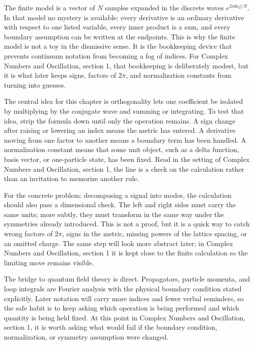 The finite model is a vector of \(N\) samples expanded in the discrete waves \(e^{2\pi \ii nj/N}\).  In that model no mystery is available: every derivative is an ordinary derivative with respect to one listed variable, every inner product is a sum, and every boundary assumption can be written at the endpoints.  This is why the finite model is not a toy in the dismissive sense.  It is the bookkeeping device that prevents continuum notation from becoming a fog of indices.  For Complex Numbers and Oscillation, section 1, that bookkeeping is deliberately modest, but it is what later keeps signs, factors of \(2\pi\), and normalization constants from turning into guesses.

The central idea for this chapter is orthogonality lets one coefficient be isolated by multiplying by the conjugate wave and summing or integrating.  To test that idea, strip the formula down until only the operation remains.  A sign change after raising or lowering an index means the metric has entered.  A derivative moving from one factor to another means a boundary term has been handled.  A normalization constant means that some unit object, such as a delta function, basis vector, or one-particle state, has been fixed.  Read in the setting of Complex Numbers and Oscillation, section 1, the line is a check on the calculation rather than an invitation to memorize another rule.

For the concrete problem: decomposing a signal into modes, the calculation should also pass a dimensional check.  The left and right sides must carry the same units; more subtly, they must transform in the same way under the symmetries already introduced.  This is not a proof, but it is a quick way to catch wrong factors of \(2\pi\), signs in the metric, missing powers of the lattice spacing, or an omitted charge.  The same step will look more abstract later; in Complex Numbers and Oscillation, section 1 it is kept close to the finite calculation so the limiting move remains visible.

The bridge to quantum field theory is direct.  Propagators, particle momenta, and loop integrals are Fourier analysis with the physical boundary condition stated explicitly.  Later notation will carry more indices and fewer verbal reminders, so the safe habit is to keep asking which operation is being performed and which quantity is being held fixed.  At this point in Complex Numbers and Oscillation, section 1, it is worth asking what would fail if the boundary condition, normalization, or symmetry assumption were changed.

